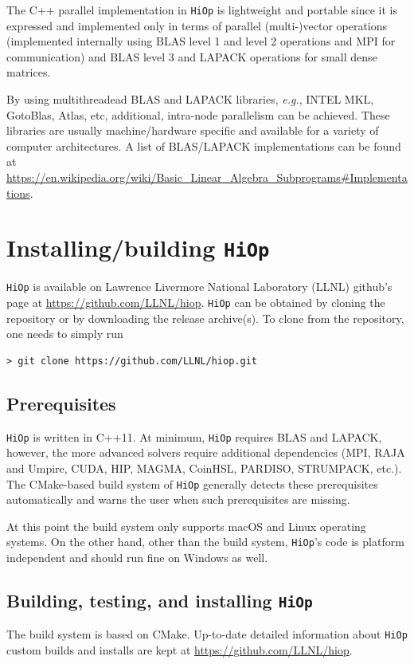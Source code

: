 \documentclass[11pt]{article}
\newcommand{\Hi}{\texttt{HiOp}\xspace}
\begin{document}
The C++ parallel implementation in \Hi
is  lightweight and portable since it is expressed and implemented  only in terms of parallel (multi-)vector operations (implemented internally using BLAS level 1 and level 2 operations and MPI for communication) and BLAS level 3 and LAPACK operations for small dense matrices.

By using multithreadead BLAS and LAPACK libraries, \textit{e.g.}, INTEL MKL, GotoBlas, Atlas, etc, additional,  intra-node parallelism can be achieved. These libraries are usually  machine/hardware specific and available for a variety of computer architectures. A list of BLAS/LAPACK implementations can be found at 
\url{https://en.wikipedia.org/wiki/Basic_Linear_Algebra_Subprograms\#Implementations}. 

\section{Installing/building \Hi}
\Hi is available on  Lawrence Livermore National Laboratory (LLNL)  github's page at 
\url{https://github.com/LLNL/hiop}. \Hi can be obtained by cloning the repository or by downloading the release archive(s). To clone from the repository, one needs to simply run
\begin{verbatim}
> git clone https://github.com/LLNL/hiop.git
\end{verbatim}

\subsection{Prerequisites} 
\Hi is written in C++11. At minimum, \Hi  requires BLAS and LAPACK, however, the more advanced solvers require additional dependencies (MPI, RAJA and Umpire, CUDA, HIP, MAGMA, CoinHSL, PARDISO, STRUMPACK, etc.). The CMake-based build system of \Hi generally detects these prerequisites automatically and warns the user when such prerequisites are missing.

At this point the build system only supports macOS and Linux operating systems. On the other hand, other than the build system, \Hi's code is  platform independent and should run fine on Windows as well.


\subsection{Building, testing, and installing \Hi}
The build system is based on CMake. Up-to-date detailed information about \Hi custom builds and installs are kept at \url{https://github.com/LLNL/hiop}. 
\end{document}

